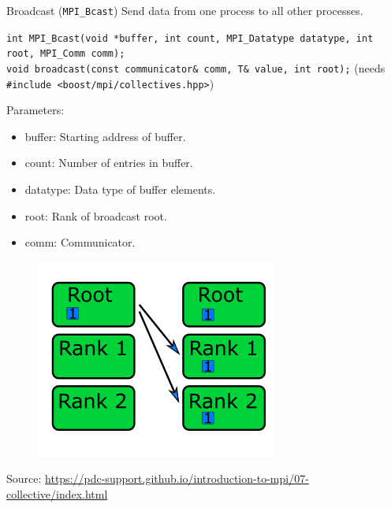 \documentclass{beamer}
\begin{document}
\begin{frame}{Broadcast (\texttt{MPI\_Bcast})}
  Send data from one process to all other processes.

  {
    \footnotesize
    \texttt{int MPI\_Bcast(void *buffer, int count, MPI\_Datatype datatype, int root, MPI\_Comm comm);} \\
    \texttt{void broadcast(const communicator\& comm, T\& value, int root);} (needs \texttt{\#include <boost/mpi/collectives.hpp>})
  }

  \begin{minipage}[t]{0.6\textwidth}
    Parameters:
    \begin{itemize}
      \item buffer: Starting address of buffer.
      \item count: Number of entries in buffer.
      \item datatype: Data type of buffer elements.
      \item root: Rank of broadcast root.
      \item comm: Communicator.
    \end{itemize}
  \end{minipage}
  \hfill
  \begin{minipage}[t]{0.35\textwidth}
    \begin{figure}[h]
      \includegraphics[]{images/broadcast.png}
    \end{figure}
  \end{minipage}
  {\footnotesize Source: \href{https://pdc-support.github.io/introduction-to-mpi/07-collective/index.html}{https://pdc-support.github.io/introduction-to-mpi/07-collective/index.html}}
\end{frame}
\end{document}
